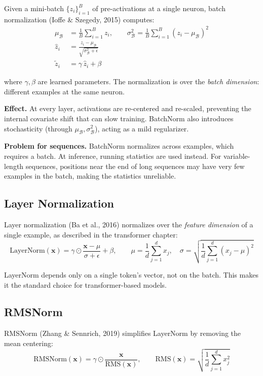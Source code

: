 \documentclass[main.tex]{subfiles}
\begin{document}
Given a mini-batch $\{z_i\}_{i=1}^{B}$ of pre-activations at a single neuron, batch normalization (Ioffe \& Szegedy, 2015) computes:
\begin{align}
\mu_{\mathcal{B}} &= \frac{1}{B}\sum_{i=1}^{B}z_i, \qquad \sigma_{\mathcal{B}}^2 = \frac{1}{B}\sum_{i=1}^{B}(z_i - \mu_{\mathcal{B}})^2 \\[6pt]
\hat{z}_i &= \frac{z_i - \mu_{\mathcal{B}}}{\sqrt{\sigma_{\mathcal{B}}^2 + \epsilon}} \\[6pt]
\tilde{z}_i &= \gamma\,\hat{z}_i + \beta
\end{align}

where $\gamma, \beta$ are learned parameters. The normalization is over the \textit{batch dimension}: different examples at the same neuron.

\textbf{Effect.} At every layer, activations are re-centered and re-scaled, preventing the internal covariate shift that can slow training. BatchNorm also introduces stochasticity (through $\mu_{\mathcal{B}}, \sigma_{\mathcal{B}}^2$), acting as a mild regularizer.

\textbf{Problem for sequences.} BatchNorm normalizes across examples, which requires a batch. At inference, running statistics are used instead. For variable-length sequences, positions near the end of long sequences may have very few examples in the batch, making the statistics unreliable.

\subsection{Layer Normalization}

Layer normalization (Ba et al., 2016) normalizes over the \textit{feature dimension} of a single example, as described in the transformer chapter:
$$\text{LayerNorm}(\mathbf{x}) = \gamma \odot \frac{\mathbf{x} - \mu}{\sigma + \epsilon} + \beta, \qquad \mu = \frac{1}{d}\sum_{j=1}^{d}x_j, \quad \sigma = \sqrt{\frac{1}{d}\sum_{j=1}^{d}(x_j - \mu)^2}$$

LayerNorm depends only on a single token's vector, not on the batch. This makes it the standard choice for transformer-based models.

\subsection{RMSNorm}

RMSNorm (Zhang \& Sennrich, 2019) simplifies LayerNorm by removing the mean centering:
$$\text{RMSNorm}(\mathbf{x}) = \gamma \odot \frac{\mathbf{x}}{\text{RMS}(\mathbf{x})}, \qquad \text{RMS}(\mathbf{x}) = \sqrt{\frac{1}{d}\sum_{j=1}^{d}x_j^2}$$
\end{document}
